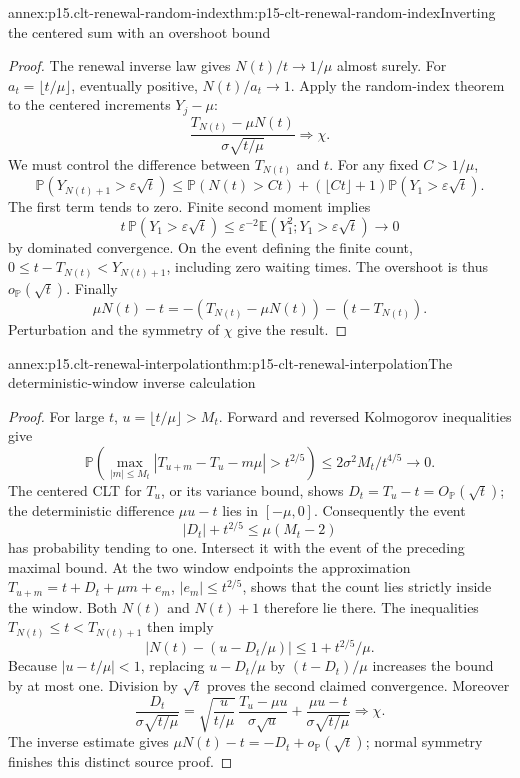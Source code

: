 \begin{annexitem}{annex:p15.clt-renewal-random-index}{thm:p15-clt-renewal-random-index}{Inverting the centered sum with an overshoot bound}
\begin{proof}
The renewal inverse law gives \(N(t)/t\to1/\mu\) almost surely.
For \(a_t=\lfloor t/\mu\rfloor\), eventually positive,
\(N(t)/a_t\to1\). Apply the random-index theorem to the centered
increments \(Y_j-\mu\):
\[
 \frac{T_{N(t)}-\mu N(t)}{\sigma\sqrt{t/\mu}}
                                      \Rightarrow\chi.
 \]
We must control the difference between \(T_{N(t)}\) and \(t\).
For any fixed \(C>1/\mu\),
\[
 \mathbb P(Y_{N(t)+1}>\varepsilon\sqrt t)
 \leq\mathbb P(N(t)>Ct)
       +(\lfloor Ct\rfloor+1)\mathbb P(Y_1>\varepsilon\sqrt t).
 \]
The first term tends to zero. Finite second moment implies
\[
 t\,\mathbb P(Y_1>\varepsilon\sqrt t)
 \leq\varepsilon^{-2}
       \mathbb E(Y_1^2;Y_1>\varepsilon\sqrt t)\longrightarrow0
 \]
by dominated convergence. On the event defining the finite count,
\(0\leq t-T_{N(t)}<Y_{N(t)+1}\), including zero waiting times.
The overshoot is thus \(o_{\mathbb P}(\sqrt t)\). Finally
\[
 \mu N(t)-t
 =-(T_{N(t)}-\mu N(t))-(t-T_{N(t)}).
 \]
Perturbation and the symmetry of \(\chi\) give the result.
\end{proof}
\end{annexitem}

\begin{annexitem}{annex:p15.clt-renewal-interpolation}{thm:p15-clt-renewal-interpolation}{The deterministic-window inverse calculation}
\begin{proof}
For large \(t\), \(u=\lfloor t/\mu\rfloor>M_t\).
Forward and reversed Kolmogorov inequalities give
\[
 \mathbb P\left(\max_{|m|\leq M_t}
       |T_{u+m}-T_u-m\mu|>t^{2/5}\right)
 \leq 2\sigma^2M_t/t^{4/5}\longrightarrow0.
 \]
The centered CLT for \(T_u\), or its variance bound, shows
\(D_t=T_u-t=O_{\mathbb P}(\sqrt t)\); the deterministic difference
\(\mu u-t\) lies in \([-\mu,0]\).
Consequently the event
\[
 |D_t|+t^{2/5}\leq\mu(M_t-2)
 \]
has probability tending to one. Intersect it with the event
of the preceding maximal bound. At the two window endpoints
the approximation \(T_{u+m}=t+D_t+\mu m+e_m\),
\(|e_m|\leq t^{2/5}\), shows that the count lies strictly
inside the window. Both \(N(t)\) and \(N(t)+1\) therefore lie
there. The inequalities
\(T_{N(t)}\leq t<T_{N(t)+1}\) then imply
\[
 |N(t)-(u-D_t/\mu)|\leq1+t^{2/5}/\mu.
 \]
Because \(|u-t/\mu|<1\), replacing \(u-D_t/\mu\) by
\((t-D_t)/\mu\) increases the bound by at most one.
Division by \(\sqrt t\) proves the second claimed convergence.
Moreover
\[
 \frac{D_t}{\sigma\sqrt{t/\mu}}
 =\sqrt{\frac{u}{t/\mu}}\,
       \frac{T_u-\mu u}{\sigma\sqrt u}
       +\frac{\mu u-t}{\sigma\sqrt{t/\mu}}
 \Rightarrow\chi.
 \]
The inverse estimate gives
\(\mu N(t)-t=-D_t+o_{\mathbb P}(\sqrt t)\);
normal symmetry finishes this distinct source proof.
\end{proof}
\end{annexitem}

